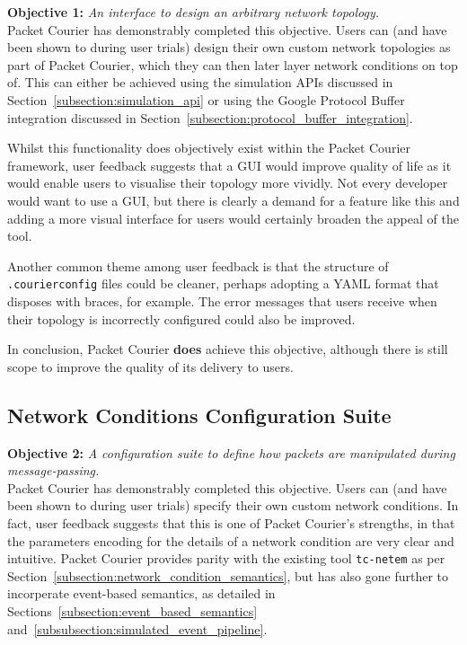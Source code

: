 \textbf{Objective 1:} \emph{An interface to design an arbitrary network topology.} \\

Packet Courier has demonstrably completed this objective. Users can (and have been shown to during user trials)
design their own custom network topologies as part of Packet Courier, which they can then later layer network
conditions on top of. This can either be achieved using the simulation APIs discussed in
Section~\ref{subsection:simulation_api} or using the Google Protocol Buffer integration discussed in
Section~\ref{subsection:protocol_buffer_integration}.

Whilst this functionality does objectively exist within the Packet Courier framework, user feedback suggests that a
GUI would improve quality of life as it would enable users to visualise their topology more vividly. Not every
developer would want to use a GUI, but there is clearly a demand for a feature like this and adding a more visual
interface for users would certainly broaden the appeal of the tool.

Another common theme among user feedback is that the structure of \texttt{.courierconfig} files could be cleaner,
perhaps adopting a YAML\cite{yaml} format that disposes with braces, for example. The error messages that users
receive when their topology is incorrectly configured could also be improved.

In conclusion, Packet Courier \textbf{does} achieve this objective, although there is still scope to improve the
quality of its delivery to users.

\subsection{Network Conditions Configuration Suite}\label{subsection:network_conditions_configuration_suite }

\textbf{Objective 2:} \emph{A configuration suite to define how packets are manipulated during message-passing.} \\

Packet Courier has demonstrably completed this objective. Users can (and have been shown to during user trials)
specify their own custom network conditions. In fact, user feedback suggests that this is one of Packet Courier's
strengths, in that the parameters encoding for the details of a network condition are very clear and intuitive.
Packet Courier provides parity with the existing tool \texttt{tc-netem}\cite{tc_netem_wiki, tc_netem_8_man} as per
Section~\ref{subsection:network_condition_semantics}, but has also gone further to incorperate event-based semantics,
as detailed in Sections~\ref{subsection:event_based_semantics} and~\ref{subsubsection:simulated_event_pipeline}.

